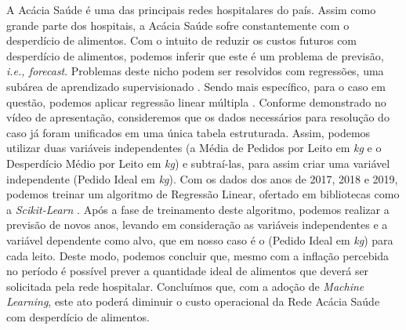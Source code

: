 A Acácia Saúde é uma das principais redes hospitalares do país. Assim como grande parte dos hospitais, a Acácia Saúde sofre constantemente com o desperdício de alimentos. Com o intuito de reduzir os custos futuros com desperdício de alimentos, podemos inferir que este é um problema de previsão, \textit{i.e., forecast}. Problemas deste nicho podem ser resolvidos com regressões, uma subárea de aprendizado supervisionado \cite{caruana2006empirical}. Sendo mais específico, para o caso em questão, podemos aplicar regressão linear múltipla \cite{aiken2012multiple}. Conforme demonstrado no vídeo de apresentação, consideremos que os dados necessários para resolução do caso já foram unificados em uma única tabela estruturada. Assim, podemos utilizar duas variáveis independentes (a Média de Pedidos por Leito em \textit{kg} e o Desperdício Médio por Leito em \textit{kg}) e subtraí-las, para assim criar uma variável independente (Pedido Ideal em \textit{kg}). Com os dados dos anos de 2017, 2018 e 2019, podemos treinar um algoritmo de Regressão Linear, ofertado em bibliotecas como a \textit{Scikit-Learn} \cite{scikit-learn}. Após a fase de treinamento deste algoritmo, podemos realizar a previsão de novos anos, levando em consideração as variáveis independentes e a variável dependente como alvo, que em nosso caso é o (Pedido Ideal em \textit{kg}) para cada leito. Deste modo, podemos concluir que, mesmo com a inflação percebida no período é possível prever a quantidade ideal de alimentos que deverá ser solicitada pela rede hospitalar. Concluímos que, com a adoção de \textit{Machine Learning}, este ato poderá diminuir o custo operacional da Rede Acácia Saúde com desperdício de alimentos.